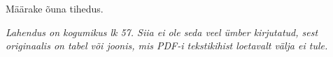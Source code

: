 
Määrake õuna tihedus.

\hint

\solu
\textit{Lahendus on kogumikus lk 57. Siia ei ole seda veel ümber kirjutatud, sest originaalis on tabel või joonis, mis PDF-i tekstikihist loetavalt välja ei tule.}
\probend

